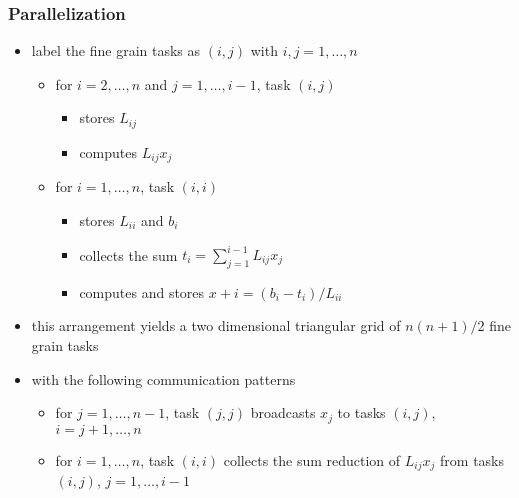 \begin{frame}[fragile]
%
  \frametitle{Parallelization}
%
  \begin{itemize}
%
  \item label the fine grain tasks as $(i,j)$ with $i,j = 1,\ldots,n$
    \begin{itemize}
    \item for $i=2,\ldots,n$ and $j=1,\ldots,i-1$, task $(i,j)$
      \begin{itemize}
      \item stores $L_{ij}$ 
      \item computes $L_{ij} x_{j}$
      \end{itemize}
    \item for $i=1,\ldots,n$, task $(i,i)$
      \begin{itemize}
      \item stores $L_{ii}$ and $b_{i}$
      \item collects the sum $t_{i} = \sum_{j=1}^{i-1} L_{ij}x_{j}$
        \item computes and stores $x+{i} = (b_{i} - t_{i})/ L_{ii}$
      \end{itemize}
    \end{itemize}
%
    \item this arrangement yields a two dimensional triangular grid of $n(n+1)/2$ fine grain tasks
%
    \item with the following communication patterns
      \begin{itemize}
      \item for $j=1,\ldots,n-1$, task $(j,j)$ broadcasts $x_{j}$ to tasks $(i,j)$,
        $i=j+1,\ldots,n$ 
      \item for $i=1,\ldots,n$, task $(i,i)$ collects the sum reduction of $L_{ij} x_{j}$ from
        tasks $(i,j)$, $j=1,\ldots,i-1$
      \end{itemize}
  \end{itemize}
%
\end{frame}

